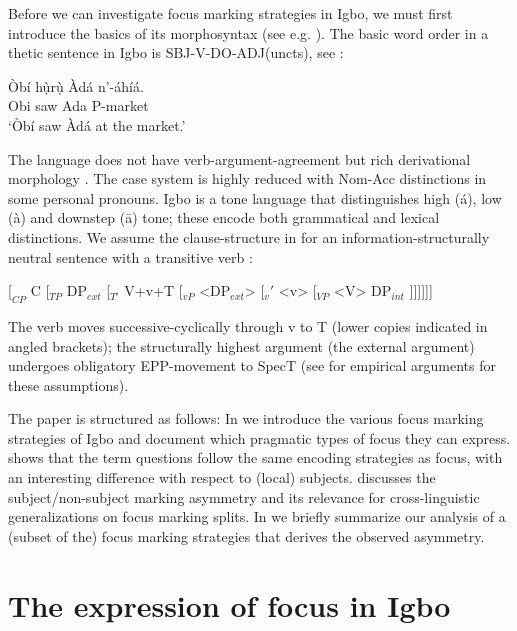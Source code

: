\documentclass[output=paper,colorlinks,citecolor=brown]{langscibook}
\begin{document}
Before we can investigate focus marking strategies in Igbo, we must first introduce the basics of its morphosyntax (see e.g. \citealt{GreenIgwe1963, Carrel1970, Manfredi1991, Mbah2006, Emenanjo2015}). The basic word order in a thetic sentence in Igbo is SBJ-V-DO-ADJ(uncts), see :

\ea%
    \label{ex:amaechi:1}
    \gll    Òbí hụ̀rụ̀ Àdá n'-áhíá.\\
            Obi saw Ada P-market\\
    \glt    `Òbí saw Àdá at the market.'
\z

The language does not have verb-argument-agreement but rich derivational morphology \citep{Uwalaka1988}. The case system is highly reduced with Nom-Acc distinctions in some personal pronouns. Igbo is a tone language that distinguishes high (\'a), low (\`a) and downstep (\=a) tone; these encode both grammatical and lexical distinctions. We assume the clause-structure in  for an information-structurally neutral sentence with a transitive verb \citep{AmaechiGeorgi2019}:

\ea%
    \label{ex:amaechi:2}
    $[_{CP}$ C [$_{TP}$ DP$_{ext}$ [$_{T'}$ V+v+T [$_{vP}$ <DP$_{ext}$> [$_v'$ <v> [$_{VP}$ <V> DP$_{int}$ ]]]]]]
\z

The verb moves successive-cyclically through v to T (lower copies indicated in angled brackets); the structurally highest argument (the external argument) undergoes obligatory EPP-movement to SpecT (see \citealt{AmaechiGeorgi2019} for empirical arguments for these assumptions).

The paper is structured as follows: In  we introduce the various focus marking strategies of Igbo and document which pragmatic types of focus they can express.  shows that the term questions follow the same encoding strategies as focus, with an interesting difference with respect to (local) subjects.  discusses the subject/non-subject marking asymmetry and its relevance for cross-linguistic generalizations on focus marking splits. In  we briefly summarize our analysis of a (subset of the) focus marking strategies that derives the observed asymmetry.

\section{The expression of focus in Igbo}\label{sec:amaechi:2}
\end{document}
